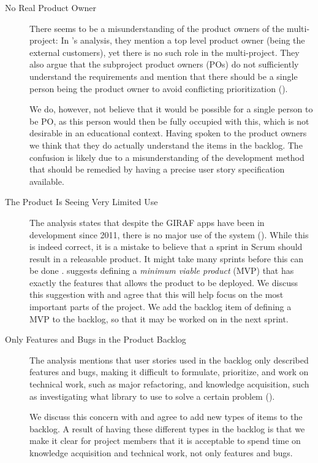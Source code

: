 \begin{description}
  \item[No Real Product Owner] There seems to be a misunderstanding of the product owners of the multi-project: In 's analysis, they mention a top level product owner (being the external customers), yet there is no such role in the multi-project. They also argue that the subproject product owners (POs) do not sufficiently understand the requirements and mention that there should be a single person being the product owner to avoid conflicting prioritization ().

We do, however, not believe that it would be possible for a single person to be PO, as this person would then be fully occupied with this, which is not desirable in an educational context. Having spoken to the product owners we think that they do actually understand the items in the backlog. The confusion is likely due to a misunderstanding of the development method that should be remedied by having a precise user story specification available.
  \item[The Product Is Seeing Very Limited Use] The analysis states that despite the GIRAF apps have been in development since 2011, there is no major use of the system (). While this is indeed correct, it is a mistake to believe that a sprint in Scrum should result in a releasable product. It might take many sprints before this can be done \parencite{larman2003}.  suggests defining a \emph{minimum viable product} (MVP) that has exactly the features that allows the product to be deployed. We discuss this suggestion with  and agree that this will help focus on the most important parts of the project. We add the backlog item of defining a MVP to the backlog, so that it may be worked on in the next sprint.
  \item[Only Features and Bugs in the Product Backlog] The analysis mentions that user stories used in the backlog only described features and bugs, making it difficult to formulate, prioritize, and work on technical work, such as major refactoring, and knowledge acquisition, such as investigating what library to use to solve a certain problem ().

We discuss this concern with  and agree to add new types of items to the backlog. A result of having these different types in the backlog is that we make it clear for project members that it is acceptable to spend time on knowledge acquisition and technical work, not only features and bugs.
\end{description}

